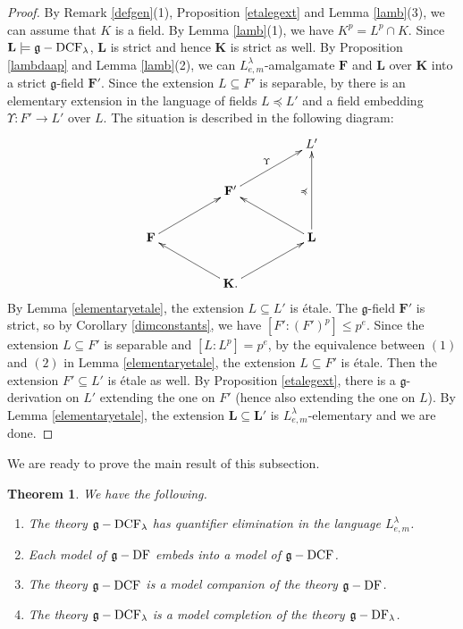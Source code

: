 \documentclass[10pt]{amsart}
\newtheorem{theorem}{Theorem}[section]
\theoremstyle{definition}
\begin{document}
\begin{proof}
By Remark \ref{defgen}(1), Proposition \ref{etalegext} and Lemma \ref{lamb}(3), we can assume that $K$ is a field. By Lemma \ref{lamb}(1), we have $K^p=L^p\cap K$. Since $\mathbf{L}\models \mathfrak{g}-\operatorname{DCF}_{\lambda}$, $\mathbf{L}$ is strict and hence $\mathbf{K}$ is strict as well.
By Proposition \ref{lambdaap} and Lemma \ref{lamb}(2), we can $L^{\lambda}_{e,m}$-amalgamate $\mathbf{F}$ and $\mathbf{L}$ over $\mathbf{K}$ into a strict $\mathfrak{g}$-field $\mathbf{F}'$. Since the extension $L\subseteq F'$ is separable, by \cite[Claim 2.2]{Del1} there is an elementary extension in the language of fields $L\preccurlyeq L'$ and a field embedding $\Upsilon:F'\to L'$ over $L$. The situation is described in the following diagram:
\begin{equation*}
\xymatrixcolsep{4pc}
\xymatrix{  &   &  L'\\
 &  \mathbf{F}'\ar[ru]^{\Upsilon} &  \\
\mathbf{F}\ar[ru]^{} &   & \mathbf{L}\ar[lu]^{} \ar[uu]^{\preccurlyeq}\\
  &  \mathbf{K}\ar[ru]^{}\ar[lu]^{}.  &  }
\end{equation*}
By Lemma \ref{elementaryetale}, the extension $L\subseteq L'$ is \'{e}tale. The $\mathfrak{g}$-field $\mathbf{F}'$ is strict, so by Corollary \ref{dimconstants}, we have $[F':(F')^p]\leqslant p^e$. Since the extension $L\subseteq F'$ is separable and $[L:L^p]=p^e$, by the equivalence between $(1)$ and $(2)$ in Lemma \ref{elementaryetale}, the extension $L\subseteq F'$ is \'{e}tale. Then the extension $F'\subseteq L'$ is  \'{e}tale as well. By Proposition \ref{etalegext}, there is a $\mathfrak{g}$-derivation on $L'$ extending the one on $F'$ (hence also extending the one on $L$). By Lemma \ref{elementaryetale}, the extension $\mathbf{L}\subseteq \mathbf{L}'$ is $L^{\lambda}_{e,m}$-elementary and we are done.
\end{proof}
\noindent
We are ready to prove the main result of this subsection.
\begin{theorem}\label{qegdcf}
We have the following.
\begin{enumerate}
\item The theory $\mathfrak{g}-\operatorname{DCF}_{\lambda}$ has quantifier elimination in the language $L^{\lambda}_{e,m}$.

\item Each model of $\mathfrak{g}-\operatorname{DF}$ embeds into a model of $\mathfrak{g}-\operatorname{DCF}$.

\item The theory $\mathfrak{g}-\operatorname{DCF}$ is a model companion of the theory $\mathfrak{g}-\operatorname{DF}$.

\item The theory $\mathfrak{g}-\operatorname{DCF}_{\lambda}$ is a model completion of the theory $\mathfrak{g}-\operatorname{DF}_{\lambda}$.
\end{enumerate}
\end{theorem}
\end{document}
